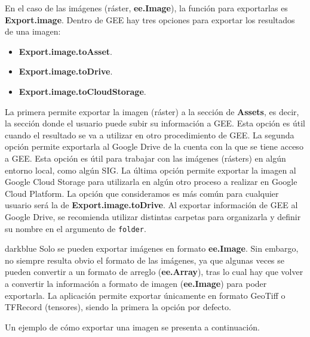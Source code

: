 \documentclass[
  12pt,
  letterpaper,
  twoside]{book}
\providecommand{\tightlist}{%
  \setlength{\itemsep}{0pt}\setlength{\parskip}{0pt}}
\newcommand\boldpurple[1]{\textcolor{darkpurple}{\textbf{#1}}}
\begin{document}
En el caso de las imágenes (ráster, \boldpurple{ee.Image}), la función para exportarlas es \boldpurple{Export.image}. Dentro de GEE hay tres opciones para exportar los resultados de una imagen:

\begin{itemize}
\tightlist
\item
  \boldpurple{Export.image.toAsset}.
\item
  \boldpurple{Export.image.toDrive}.
\item
  \boldpurple{Export.image.toCloudStorage}.
\end{itemize}

La primera permite exportar la imagen (ráster) a la sección de \textbf{Assets}, es decir, la sección donde el usuario puede subir su información a GEE. Esta opción es útil cuando el resultado se va a utilizar en otro procedimiento de GEE. La segunda opción permite exportarla al Google Drive de la cuenta con la que se tiene acceso a GEE. Esta opción es útil para trabajar con las imágenes (rásters) en algún entorno local, como algún SIG. La última opción permite exportar la imagen al Google Cloud Storage para utilizarla en algún otro proceso a realizar en Google Cloud Platform. La opción que consideramos es más común para cualquier usuario será la de \boldpurple{Export.image.toDrive}. Al exportar información de GEE al Google Drive, se recomienda utilizar distintas carpetas para organizarla y definir su nombre en el argumento de \texttt{folder}.

\begin{bluebox2}

\begin{awesomeblock}{5pt}{\faLightbulb}{darkblue}
Solo se pueden exportar imágenes en formato \boldpurple{ee.Image}. Sin embargo, no siempre resulta obvio el formato de las imágenes, ya que algunas veces se pueden convertir a un formato de arreglo (\boldpurple{ee.Array}), tras lo cual hay que volver a convertir la información a formato de imagen (\boldpurple{ee.Image}) para poder exportarla. La aplicación permite exportar únicamente en formato GeoTiff o TFRecord (tensores), siendo la primera la opción por defecto.

\end{awesomeblock}

\end{bluebox2}

Un ejemplo de cómo exportar una imagen se presenta a continuación.
\end{document}
